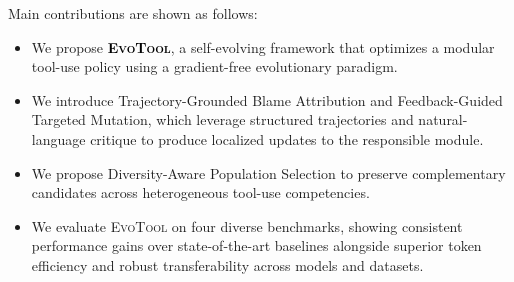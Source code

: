 \documentclass[11pt]{article}
\begin{document}
Main contributions are shown as follows:
\begin{itemize}
    \item We propose \textbf{\textcolor{black}{\textsc{EvoTool}}}, a self-evolving framework that optimizes a modular tool-use policy using a gradient-free evolutionary paradigm.
    \item We introduce Trajectory-Grounded Blame Attribution and Feedback-Guided Targeted Mutation, which leverage structured trajectories and natural-language critique to produce localized updates to the responsible module.
    \item We propose Diversity-Aware Population Selection to preserve complementary candidates across heterogeneous tool-use competencies.
    \item We evaluate \textsc{EvoTool} on four diverse benchmarks, showing consistent performance gains over state-of-the-art baselines alongside superior token efficiency and robust transferability across models and datasets.
\end{itemize}









\end{document}
